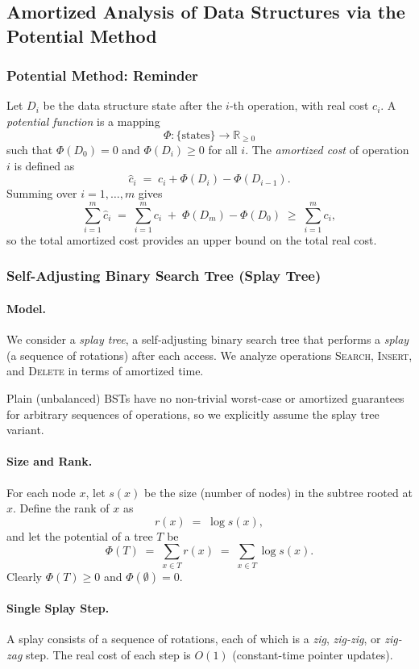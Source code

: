 \documentclass[9pt]{extarticle}
\begin{document}
\subsection{Amortized Analysis of Data Structures via the Potential Method}

\subsubsection*{Potential Method: Reminder}
Let $D_i$ be the data structure state after the $i$-th operation, with real cost $c_i$.
A \emph{potential function} is a mapping
\[
  \Phi : \{ \text{states} \} \to \mathbb{R}_{\ge 0}
\]
such that $\Phi(D_0) = 0$ and $\Phi(D_i) \ge 0$ for all $i$.
The \emph{amortized cost} of operation $i$ is defined as
\[
  \hat c_i \;=\; c_i + \Phi(D_i) - \Phi(D_{i-1}).
\]
Summing over $i=1,\dots, m$ gives
\[
  \sum_{i=1}^m \hat c_i
  \;=\; \sum_{i=1}^m c_i \;+\; \Phi(D_m) - \Phi(D_0)
  \;\ge\; \sum_{i=1}^m c_i,
\]
so the total amortized cost provides an upper bound on the total real cost.

\subsubsection{Self-Adjusting Binary Search Tree (Splay Tree)}

\paragraph{Model.}
We consider a \emph{splay tree}, a self-adjusting binary search tree that performs
a \emph{splay} (a sequence of rotations) after each access.
We analyze operations \textsc{Search}, \textsc{Insert}, and \textsc{Delete}
in terms of amortized time.

Plain (unbalanced) BSTs have no non-trivial worst-case or amortized guarantees
for arbitrary sequences of operations, so we explicitly assume the splay tree variant.

\paragraph{Size and Rank.}
For each node $x$, let $s(x)$ be the size (number of nodes) in the subtree rooted at $x$.
Define the rank of $x$ as
\[
  r(x) \;=\; \log s(x),
\]
and let the potential of a tree $T$ be
\[
  \Phi(T) \;=\; \sum_{x \in T} r(x)
             \;=\; \sum_{x \in T} \log s(x).
\]
Clearly $\Phi(T) \ge 0$ and $\Phi(\emptyset) = 0$.

\paragraph{Single Splay Step.}
A splay consists of a sequence of rotations, each of which is a \emph{zig}, \emph{zig-zig}, or \emph{zig-zag} step.
The real cost of each step is $O(1)$ (constant-time pointer updates).
\end{document}
